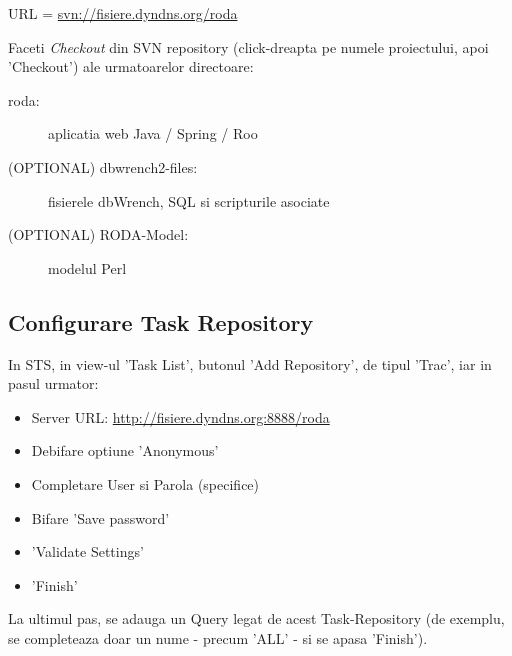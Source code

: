 URL = \url{svn://fisiere.dyndns.org/roda}

Faceti \emph{Checkout} din SVN repository (click-dreapta pe numele
proiectului, apoi 'Checkout') ale urmatoarelor directoare:
\begin{description}
\item [roda:] aplicatia web Java / Spring / Roo
\item [(OPTIONAL) dbwrench2-files:] fisierele dbWrench, SQL si scripturile asociate
\item [(OPTIONAL) RODA-Model:] modelul Perl
\end{description}

\begin{comment}
In STS, se face upgrade la Subversion 1.7 (pt. working copy) pentru fiecare din proiectele de mai sus: 
in perspectiva 'Spring', 
in view-ul 'Package Explorer' sau in view-ul 'Navigator', 
click-dreapta pe numele proiectului respectiv,
si apoi in meniul aparut:
'Team' -> 'Upgrade' -> 'OK'. 
Poate aparea un mesaj de eroare/warning, care indica
faptul ca working-copy local este deja conform versiunii 1.7 a SVN.
\end{comment}

\subsection{Configurare Task Repository}
In STS, in view-ul 'Task List', butonul 'Add Repository', de tipul 'Trac', 
iar in pasul urmator:
\begin{itemize}
\item 
Server URL:    \url{http://fisiere.dyndns.org:8888/roda}
\item
Debifare optiune 'Anonymous'
\item
Completare User si Parola (specifice)
\item
Bifare 'Save password'
\item
'Validate Settings'
\item
'Finish'
\end{itemize}

La ultimul pas, se adauga un Query legat de acest Task-Repository (de exemplu,
se completeaza doar un nume - precum 'ALL' - si se apasa 'Finish').

